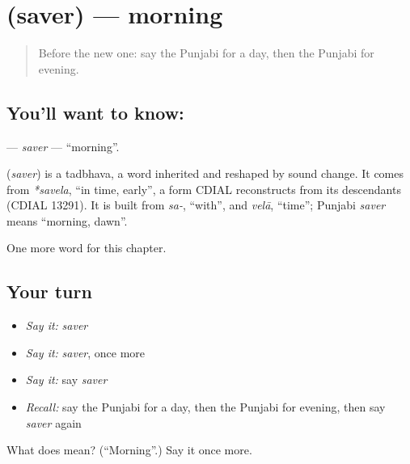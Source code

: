 \section[\texorpdfstring{\pa{ਸਵੇਰ} (saver)}{ਸਵੇਰ (saver)}]{ (saver) — morning}

\label{lesson:PA-C85-saver}



\begin{quote}
Before the new one: say the Punjabi for a day, then the Punjabi for evening.
\end{quote}

\subsection*{You'll want to know: }
\textbf{} — \emph{saver} — \textquotedblleft{}morning\textquotedblright{}.

\begin{cousinweb}
\textbf{} (\emph{saver}) is a tadbhava, a word inherited and reshaped by sound change. It comes from \emph{*savela}, \textquotedblleft{}in time, early\textquotedblright{}, a form CDIAL reconstructs from its descendants (CDIAL 13291). It is built from \emph{sa-}, \textquotedblleft{}with\textquotedblright{}, and \emph{velā}, \textquotedblleft{}time\textquotedblright{}; Punjabi \emph{saver} means \textquotedblleft{}morning, dawn\textquotedblright{}.
\end{cousinweb}

\begin{grammarlens}[title={What you've built}]
One more word for this chapter.
\end{grammarlens}

\subsection*{Your turn}
\begin{itemize}
\raggedright
  \item \emph{Say it:} \emph{saver}
  \item \emph{Say it:} \emph{saver}, once more
  \item \emph{Say it:} say \emph{saver}
  \item \emph{Recall:} say the Punjabi for a day, then the Punjabi for evening, then say \emph{saver} again
\end{itemize}

\begin{tcolorbox}[breakable,colback=teal!4,colframe=teal!35!black,title={Before you move on}]
What does  mean? (\textquotedblleft{}Morning\textquotedblright{}.) Say it once more.
\end{tcolorbox}
